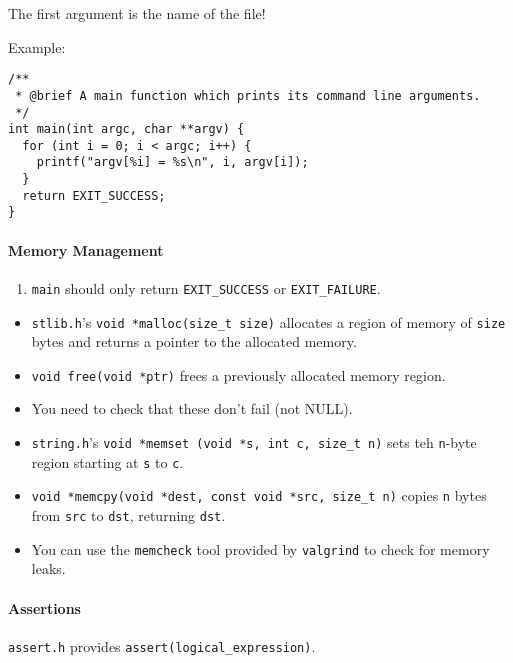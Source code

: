 \documentclass[twocolumn,english]{article}
\begin{document}
The first argument is the name of the file!

Example:

\begin{verbatim}
/**
 * @brief A main function which prints its command line arguments.
 */
int main(int argc, char **argv) {
  for (int i = 0; i < argc; i++) {
    printf("argv[%i] = %s\n", i, argv[i]);
  }
  return EXIT_SUCCESS;
}
\end{verbatim}

\paragraph{Memory Management}\label{memory-management}

\begin{enumerate}
\def\labelenumi{\arabic{enumi}.}

\item
  \texttt{main} should only return \texttt{EXIT\_SUCCESS} or
  \texttt{EXIT\_FAILURE}.
\end{enumerate}

\begin{itemize}

\item
  \texttt{stlib.h}'s \texttt{void\ *malloc(size\_t\ size)} allocates a
  region of memory of \texttt{size} bytes and returns a pointer to the
  allocated memory.
\item
  \texttt{void\ free(void\ *ptr)} frees a previously allocated memory
  region.
\item
  You need to check that these don't fail (not NULL).
\item
  \texttt{string.h}'s
  \texttt{void\ *memset\ (void\ *s,\ int\ c,\ size\_t\ n)} sets teh
  \texttt{n}-byte region starting at \texttt{s} to \texttt{c}.
\item
  \texttt{void\ *memcpy(void\ *dest,\ const\ void\ *src,\ size\_t\ n)}
  copies \texttt{n} bytes from \texttt{src} to \texttt{dst}, returning
  \texttt{dst}.
\item
  You can use the \texttt{memcheck} tool provided by \texttt{valgrind}
  to check for memory leaks.
\end{itemize}

\paragraph{Assertions}\label{assertions}

\texttt{assert.h} provides \texttt{assert(logical\_expression)}.
\end{document}
